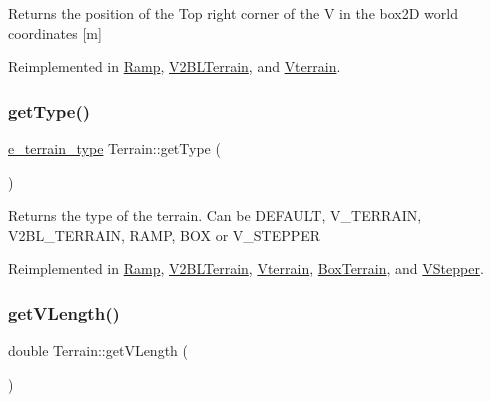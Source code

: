 \begin{DoxyReturn}{Returns}
the position of the Top right corner of the V in the box2D world coordinates \mbox{[}m\mbox{]} 
\end{DoxyReturn}


Reimplemented in \mbox{\hyperlink{class_ramp_a72b5d41278e4ff65df8f80657ae7d9e1}{Ramp}}, \mbox{\hyperlink{class_v2_b_l_terrain_a2a3dc6ef761a5ab416669ce5f793558b}{V2\+B\+L\+Terrain}}, and \mbox{\hyperlink{class_vterrain_a27258a597b11a9cb78bd7e537fb037c4}{Vterrain}}.

\mbox{\label{class_terrain_a6cd1220b8e64466cc7a2219efff4141b}} 
\subsubsection{\texorpdfstring{get\+Type()}{getType()}}
{\footnotesize\ttfamily \mbox{\hyperlink{_terrain_8h_a6d0b7e83bb7325270c1162bece970fd8}{e\+\_\+terrain\+\_\+type}} Terrain\+::get\+Type (\begin{DoxyParamCaption}{ }\end{DoxyParamCaption})\hspace{0.3cm}{\ttfamily [virtual]}}

\begin{DoxyReturn}{Returns}
the type of the terrain. Can be D\+E\+F\+A\+U\+LT, V\+\_\+\+T\+E\+R\+R\+A\+IN, V2\+B\+L\+\_\+\+T\+E\+R\+R\+A\+IN, R\+A\+MP, B\+OX or V\+\_\+\+S\+T\+E\+P\+P\+ER 
\end{DoxyReturn}


Reimplemented in \mbox{\hyperlink{class_ramp_a25dce9bce336a8524be1de1abd6f1af3}{Ramp}}, \mbox{\hyperlink{class_v2_b_l_terrain_a4ac0574a992aadd7cfcad6eba6b55000}{V2\+B\+L\+Terrain}}, \mbox{\hyperlink{class_vterrain_abf5de57e84f4aac4f7cdb5c4f3e37b6a}{Vterrain}}, \mbox{\hyperlink{class_box_terrain_a8056b743b0cc1fbd38e742f542dfa34b}{Box\+Terrain}}, and \mbox{\hyperlink{class_v_stepper_a9621c3cbd705479e32baf9671983cb8b}{V\+Stepper}}.

\mbox{\label{class_terrain_a819253da1f67d199b6347b93071961e7}} 
\subsubsection{\texorpdfstring{get\+V\+Length()}{getVLength()}}
{\footnotesize\ttfamily double Terrain\+::get\+V\+Length (\begin{DoxyParamCaption}{ }\end{DoxyParamCaption})\hspace{0.3cm}{\ttfamily [inline]}}

